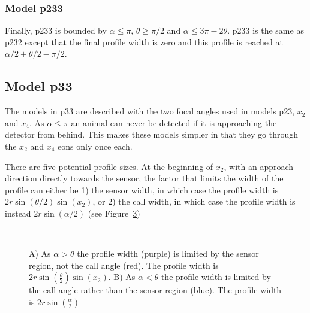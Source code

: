 

\subsubsection{Model p233} \label{p233}

Finally, p233 is bounded by $\alpha\le \pi$, $\theta\ge \pi/2$ and $\alpha \le 3\pi - 2\theta$. p233 is the same as p232 except that the final profile width is zero and this profile is reached at $\alpha/2+\theta/2-\pi/2$. 



\subsection{Model p33} \label{p33}
 
The models in p33 are described with the two focal angles used in models p23, $x_2$ and $x_4$. As $\alpha \le\pi$ an animal can never be detected if it is approaching the detector from behind. This makes these models simpler in that they go through the $x_2$ and $x_4$ eons only once each. 

There are five potential profile sizes. At the beginning of $x_2$, with an approach direction directly towards the sensor, the factor that limits the width of the profile can either be 1) the sensor width,  in which case the profile width is $2r\sin\left(\theta/2\right)\sin(x_2)$, or 2) the call width, in which case the profile width is instead $2r\sin(\alpha /2)$ (see Figure~\ref{f:p33})

\begin{figure}[t]
        \centering
        \begin{subfigure}[t]{0.4\textwidth}
                \centering
                \caption{}
                \label{f:p33x2a}
        \end{subfigure}
	~
	\begin{subfigure}[t]{0.4\textwidth}
                \centering
                \caption{}
                \label{f:p33x2t}
        \end{subfigure}

\caption{A) As $\alpha > \theta$ the profile width (purple) is limited by the sensor region, not the call angle (red). The profile width is $2r\sin\left(\frac{\theta}{2}\right)\sin(x_2)$. B) As $\alpha < \theta$ the profile width is limited by the call angle rather than the sensor region (blue). The profile width is $2r\sin\left(\frac{\alpha}{2}\right)$   }
\label{f:p33}
\end{figure}


